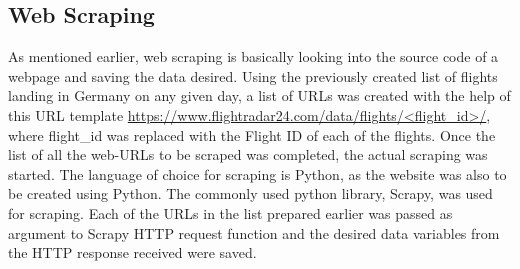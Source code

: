 \subsection{Web Scraping}
As mentioned earlier, web scraping is basically looking into the source code of a webpage and saving the data desired. Using the previously created list of flights landing in Germany on any given day, a list of URLs was created with the help of this URL template \url{https://www.flightradar24.com/data/flights/<flight_id>/}, where flight\_id was replaced with the Flight ID of each of the flights. 
Once the list of all the web-URLs to be scraped was completed, the actual scraping was started. The language of choice for scraping is Python, as the website was also to be created using Python. The commonly used python library, Scrapy, was used for scraping. Each of the URLs in the list prepared earlier was passed as argument to Scrapy HTTP request function and the desired data variables from  the HTTP response received were saved.
 

